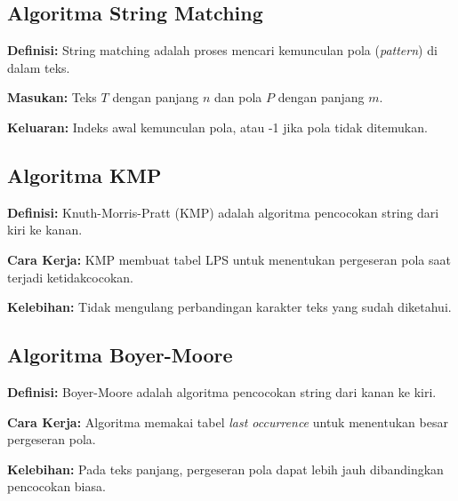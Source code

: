 \subsection{Algoritma String Matching}
\textbf{Definisi:} String matching adalah proses mencari kemunculan pola (\textit{pattern}) di dalam teks.

\textbf{Masukan:} Teks $T$ dengan panjang $n$ dan pola $P$ dengan panjang $m$.

\textbf{Keluaran:} Indeks awal kemunculan pola, atau -1 jika pola tidak ditemukan.

\subsection{Algoritma KMP}
\textbf{Definisi:} Knuth-Morris-Pratt (KMP) adalah algoritma pencocokan string dari kiri ke kanan.

\textbf{Cara Kerja:} KMP membuat tabel LPS untuk menentukan pergeseran pola saat terjadi ketidakcocokan.

\textbf{Kelebihan:} Tidak mengulang perbandingan karakter teks yang sudah diketahui.

\subsection{Algoritma Boyer-Moore}
\textbf{Definisi:} Boyer-Moore adalah algoritma pencocokan string dari kanan ke kiri.

\textbf{Cara Kerja:} Algoritma memakai tabel \textit{last occurrence} untuk menentukan besar pergeseran pola.

\textbf{Kelebihan:} Pada teks panjang, pergeseran pola dapat lebih jauh dibandingkan pencocokan biasa.
